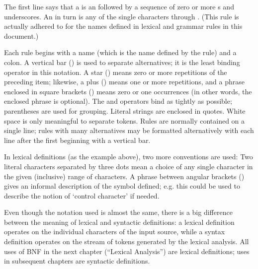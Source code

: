 The first line says that a  is an  followed by
a sequence of zero or more s and underscores.  An
 in turn is any of the single characters 
through .  (This rule is actually adhered to for the
names defined in lexical and grammar rules in this document.)

Each rule begins with a name (which is the name defined by the rule)
and a colon.  A vertical bar (\code{|}) is used to separate
alternatives; it is the least binding operator in this notation.  A
star (\code{*}) means zero or more repetitions of the preceding item;
likewise, a plus (\code{+}) means one or more repetitions, and a
phrase enclosed in square brackets (\code{[ ]}) means zero or one
occurrences (in other words, the enclosed phrase is optional).  The
\code{*} and \code{+} operators bind as tightly as possible;
parentheses are used for grouping.  Literal strings are enclosed in
quotes.  White space is only meaningful to separate tokens.
Rules are normally contained on a single line; rules with many
alternatives may be formatted alternatively with each line after the
first beginning with a vertical bar.

In lexical definitions (as the example above), two more conventions
are used: Two literal characters separated by three dots mean a choice
of any single character in the given (inclusive) range of \ASCII{}
characters.  A phrase between angular brackets () gives an
informal description of the symbol defined; e.g. this could be used
to describe the notion of `control character' if needed.

Even though the notation used is almost the same, there is a big
difference between the meaning of lexical and syntactic definitions:
a lexical definition operates on the individual characters of the
input source, while a syntax definition operates on the stream of
tokens generated by the lexical analysis.  All uses of BNF in the next
chapter (``Lexical Analysis'') are lexical definitions; uses in
subsequent chapters are syntactic definitions.
